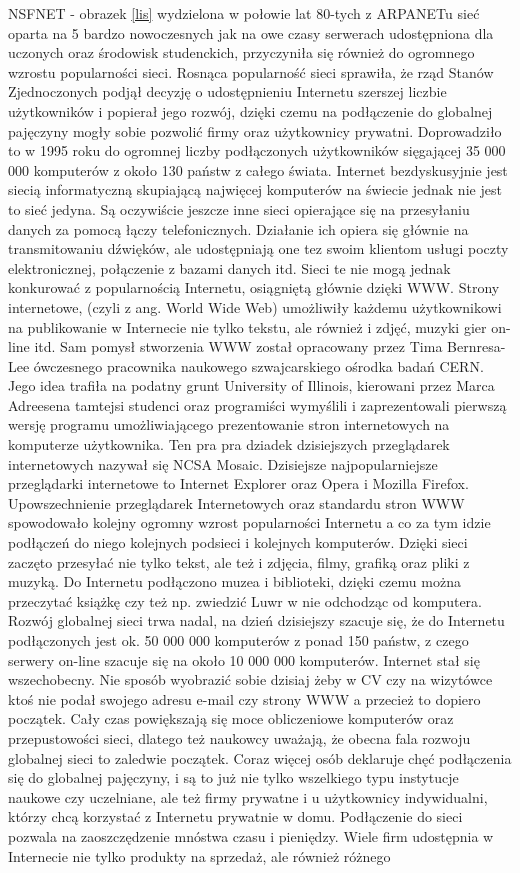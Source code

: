 \documentclass{article}
\begin{document}
NSFNET - obrazek  \ref{lis}  wydzielona w połowie lat 80-tych z ARPANETu sieć oparta na 5 bardzo nowoczesnych jak na owe czasy serwerach udostępniona dla uczonych oraz środowisk studenckich, przyczyniła się również do ogromnego wzrostu popularności sieci. Rosnąca popularność sieci sprawiła, że rząd Stanów Zjednoczonych podjął decyzję o udostępnieniu Internetu szerszej liczbie użytkowników i popierał jego rozwój, dzięki czemu na podłączenie do globalnej pajęczyny mogły sobie pozwolić firmy oraz użytkownicy prywatni. Doprowadziło to w 1995 roku do ogromnej liczby podłączonych użytkowników sięgającej 35 000 000 komputerów z około 130 państw z całego świata. Internet bezdyskusyjnie jest siecią informatyczną skupiającą najwięcej komputerów na świecie jednak nie jest to sieć jedyna. Są oczywiście jeszcze inne sieci opierające się na przesyłaniu danych za pomocą łączy telefonicznych. Działanie ich opiera się głównie na transmitowaniu dźwięków, ale udostępniają one tez swoim klientom usługi poczty elektronicznej, połączenie z bazami danych itd. Sieci te nie mogą jednak konkurować z popularnością Internetu, osiągniętą głównie dzięki WWW. Strony internetowe, (czyli z ang. World Wide Web) umożliwiły każdemu użytkownikowi na publikowanie w Internecie nie tylko tekstu, ale również i zdjęć, muzyki gier on-line itd. Sam pomysł stworzenia WWW został opracowany przez Tima Bernresa-Lee ówczesnego pracownika naukowego szwajcarskiego ośrodka badań CERN. Jego idea trafiła na podatny grunt University of Illinois, kierowani przez Marca Adreesena tamtejsi studenci oraz programiści wymyślili i zaprezentowali pierwszą wersję programu umożliwiającego prezentowanie stron internetowych na komputerze użytkownika. Ten pra pra dziadek dzisiejszych przeglądarek internetowych nazywał się NCSA Mosaic. Dzisiejsze najpopularniejsze przeglądarki internetowe to Internet Explorer oraz Opera i Mozilla Firefox. Upowszechnienie przeglądarek Internetowych oraz standardu stron WWW spowodowało kolejny ogromny wzrost popularności Internetu a co za tym idzie podłączeń do niego kolejnych podsieci i kolejnych komputerów. Dzięki sieci zaczęto przesyłać nie tylko tekst, ale też i zdjęcia, filmy, grafiką oraz pliki z muzyką. Do Internetu podłączono muzea i biblioteki, dzięki czemu można przeczytać książkę czy też np. zwiedzić Luwr w nie odchodząc od komputera. Rozwój globalnej sieci trwa nadal, na dzień dzisiejszy szacuje się, że do Internetu podłączonych jest ok. 50 000 000 komputerów z ponad 150 państw, z czego serwery on-line szacuje się na około 10 000 000 komputerów. Internet stał się wszechobecny. Nie sposób wyobrazić sobie dzisiaj żeby w CV czy na wizytówce ktoś nie podał swojego adresu e-mail czy strony WWW a przecież to dopiero początek. Cały czas powiększają się moce obliczeniowe komputerów oraz przepustowości sieci, dlatego też naukowcy uważają, że obecna fala rozwoju globalnej sieci to zaledwie początek. Coraz więcej osób deklaruje chęć podłączenia się do globalnej pajęczyny, i są to już nie tylko wszelkiego typu instytucje naukowe czy uczelniane, ale też firmy prywatne i u użytkownicy indywidualni, którzy chcą korzystać z Internetu prywatnie w domu. Podłączenie do sieci pozwala na zaoszczędzenie mnóstwa czasu i pieniędzy. Wiele firm udostępnia w Internecie nie tylko produkty na sprzedaż, ale również różnego 
\end{document}

